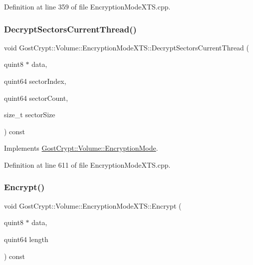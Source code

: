 Definition at line 359 of file Encryption\+Mode\+X\+T\+S.\+cpp.

\mbox{\label{class_gost_crypt_1_1_volume_1_1_encryption_mode_x_t_s_a391a08eb12f92d855ac49dd3e7fddaf0}} 
\subsubsection{\texorpdfstring{Decrypt\+Sectors\+Current\+Thread()}{DecryptSectorsCurrentThread()}}
{\footnotesize\ttfamily void Gost\+Crypt\+::\+Volume\+::\+Encryption\+Mode\+X\+T\+S\+::\+Decrypt\+Sectors\+Current\+Thread (\begin{DoxyParamCaption}\item[{quint8 $\ast$}]{data,  }\item[{quint64}]{sector\+Index,  }\item[{quint64}]{sector\+Count,  }\item[{size\+\_\+t}]{sector\+Size }\end{DoxyParamCaption}) const\hspace{0.3cm}{\ttfamily [virtual]}}



Implements \hyperlink{class_gost_crypt_1_1_volume_1_1_encryption_mode_ac0aff16d606ff0097344d0af157cb8f5}{Gost\+Crypt\+::\+Volume\+::\+Encryption\+Mode}.



Definition at line 611 of file Encryption\+Mode\+X\+T\+S.\+cpp.

\mbox{\label{class_gost_crypt_1_1_volume_1_1_encryption_mode_x_t_s_a2802c291ee815c9ed2280aa1498d7afb}} 
\subsubsection{\texorpdfstring{Encrypt()}{Encrypt()}}
{\footnotesize\ttfamily void Gost\+Crypt\+::\+Volume\+::\+Encryption\+Mode\+X\+T\+S\+::\+Encrypt (\begin{DoxyParamCaption}\item[{quint8 $\ast$}]{data,  }\item[{quint64}]{length }\end{DoxyParamCaption}) const\hspace{0.3cm}{\ttfamily [virtual]}}



